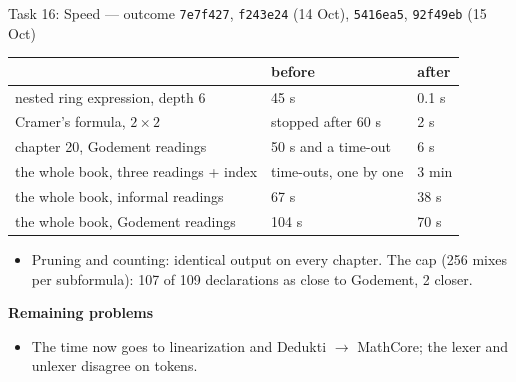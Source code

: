 \documentclass[10pt,aspectratio=169]{beamer}
\newcommand{\bad}[1]{\textcolor{warn}{#1}}
\newcommand{\commit}[1]{\texttt{\footnotesize #1}}
\begin{document}
\begin{frame}{Task 16: Speed --- outcome}
  \commit{7e7f427}, \commit{f243e24} (14 Oct), \commit{5416ea5}, \commit{92f49eb} (15 Oct)
  \begin{center}\footnotesize
  \begin{tabular}{lll}
    \toprule
    & \textbf{before} & \textbf{after} \\
    \midrule
    nested ring expression, depth 6 & 45 s & 0.1 s \\
    Cramer's formula, $2 \times 2$ & \bad{stopped after 60 s} & 2 s \\
    chapter 20, Godement readings & 50 s and a time-out & 6 s \\
    the whole book, three readings + index & \bad{time-outs}, one by one & 3 min \\
    the whole book, informal readings & 67 s & 38 s \\
    the whole book, Godement readings & 104 s & 70 s \\
    \bottomrule
  \end{tabular}
  \end{center}
  \begin{itemize}\small
    \item Pruning and counting: identical output on every chapter. The cap (256 mixes
          per subformula): 107 of 109 declarations as close to Godement, 2 closer.
  \end{itemize}
  \textbf{Remaining problems}
  \begin{itemize}\small
    \item The time now goes to linearization and Dedukti $\to$ MathCore;
          the lexer and unlexer disagree on tokens.
  \end{itemize}
\end{frame}
\end{document}
